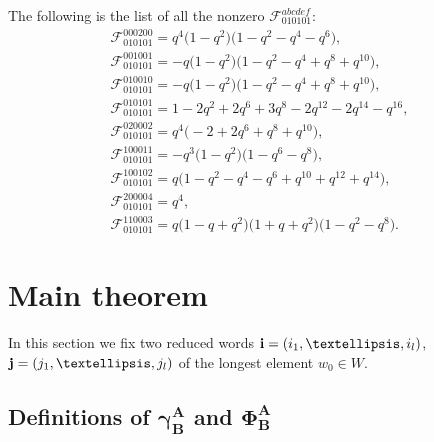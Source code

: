 \documentclass[11pt]{article}
\begin{document}
\begin{example}
The following is the list of all the nonzero $\mathscr{F}^{abcdef}_{010101}$:
\begin{gather*}
\mathscr{F}^{000200}_{010101}
  = q^4 \big(1 - q^2\big) \big(1 - q^2 - q^4 - q^6\big),
\\
\mathscr{F}^{001001}_{010101}
  = -q \big(1 - q^2\big) \big(1 - q^2 - q^4 + q^8 + q^{10}\big), \\
\mathscr{F}^{010010}_{010101}
 = -q \big(1 - q^2\big) \big(1 - q^2 - q^4 + q^8 + q^{10}\big),
\\
\mathscr{F}^{010101}_{010101}
 =  1 - 2 q^2 + 2 q^6 + 3 q^8 - 2 q^{12} - 2 q^{14} - q^{16}, \\
\mathscr{F}^{020002}_{010101}
 =  q^4 \big({-}2 + 2 q^6 + q^8 + q^{10}\big),
\\
\mathscr{F}^{100011}_{010101}
 = -q^3 \big(1 - q^2\big) \big(1 - q^6 - q^8\big), \\
\mathscr{F}^{100102}_{010101}
 =  q \big(1 - q^2 - q^4 - q^6 + q^{10} + q^{12} + q^{14}\big),
\\
\mathscr{F}^{200004}_{010101}  = q^4, \\
\mathscr{F}^{11000 3}_{010101}
 = q \big(1 - q + q^2\big) \big(1 + q + q^2\big) \big(1 - q^2 - q^8\big).
\end{gather*}
\end{example}


\section{Main theorem}\label{a:sec5}

In this section we f\/ix two reduced words ${\bf i}=(i_1,\ldots,i_l)$,
${\bf j}=(j_1,\ldots,j_l)$ of the longest element $w_0\in W$.

\subsection[Definitions of $\gamma^A_B$ and $\Phi^A_B$]{Def\/initions of $\boldsymbol{\gamma^A_B}$ and $\boldsymbol{\Phi^A_B}$}
\end{document}
